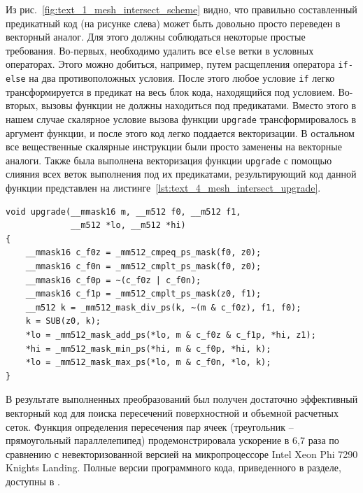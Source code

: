 Из рис.~\ref{fig:text_1_mesh_intersect_scheme} видно, что правильно составленный предикатный код (на рисунке слева) может быть довольно просто переведен в векторный аналог.
Для этого должны соблюдаться некоторые простые требования.
Во-первых, необходимо удалить все \texttt{else} ветки в условных операторах.
Этого можно добиться, например, путем расщепления оператора \texttt{if-else} на два противоположных условия.
После этого любое условие \texttt{if} легко трансформируется в предикат на весь блок кода, находящийся под условием.
Во-вторых, вызовы функции не должны находиться под предикатами.
Вместо этого в нашем случае скалярное условие вызова функции \texttt{upgrade} трансформировалось в аргумент функции, и после этого код легко поддается векторизации.
В остальном все вещественные скалярные инструкции были просто заменены на векторные аналоги.
Также была выполнена векторизация функции \texttt{upgrade} с помощью слияния всех веток выполнения под их предикатами, результирующий код данной функции представлен на листинге~\ref{lst:text_4_mesh_intersect_upgrade}.

\begin{lstlisting}[caption={Векторная реализация функции upgrade с пропагированным условием вызова внутрь функции.},label={lst:text_4_mesh_intersect_upgrade}]
void upgrade(__mmask16 m, __m512 f0, __m512 f1,
             __m512 *lo, __m512 *hi)
{
    __mmask16 c_f0z = _mm512_cmpeq_ps_mask(f0, z0);
    __mmask16 c_f0n = _mm512_cmplt_ps_mask(f0, z0);
    __mmask16 c_f0p = ~(c_f0z | c_f0n);
    __mmask16 c_f1p = _mm512_cmplt_ps_mask(z0, f1);
    __m512 k = _mm512_mask_div_ps(k, ~(m & c_f0z), f1, f0);
    k = SUB(z0, k);
    *lo = _mm512_mask_add_ps(*lo, m & c_f0z & c_f1p, *hi, z1);
    *hi = _mm512_mask_min_ps(*hi, m & c_f0p, *hi, k);
    *lo = _mm512_mask_max_ps(*lo, m & c_f0n, *lo, k);
}
\end{lstlisting}

В результате выполненных преобразований был получен достаточно эффективный векторный код для поиска пересечений поверхностной и объемной расчетных сеток.
Функция определения пересечения пар ячеек (треугольник -- прямоугольный параллелепипед) продемонстрировала ускорение в 6,7 раза по сравнению с невекторизованной версией на микропроцессоре Intel Xeon Phi 7290 Knights Landing.
Полные версии программного кода, приведенного в разделе, доступны в \cite{iparGithub}.
